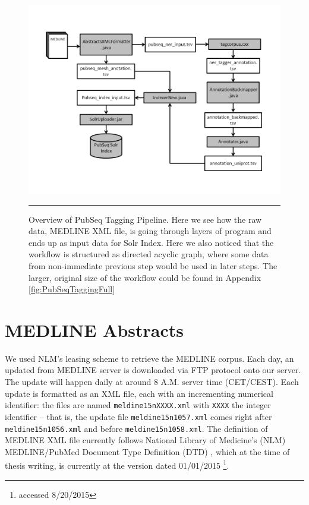 \begin{figure}[htbp]
    \includegraphics[width=6in]{Figures/tagging_pipeline_complete.png}
    \rule{35em}{0.5pt}
  \caption[(Resized) Overview of PubSeq Tagging Pipeline with all essential programs showed as nodes and important input/output files shown]{Overview of PubSeq Tagging Pipeline. Here we see how the raw data, MEDLINE XML file, is going through layers of program and ends up as input data for Solr Index. Here we also noticed that the workflow is structured as directed acyclic graph, where some data from non-immediate previous step would be used in later steps. The larger, original size of the workflow could be found in Appendix \ref{fig:PubSeqTaggingFull}}
  \label{fig:PubSeqTaggingComplete}
\end{figure}


\section{MEDLINE Abstracts}

\label{sec:MEDLINEAbstracts}

We used NLM's leasing scheme \citep{MEDLINE} to retrieve the MEDLINE corpus. Each day, an updated from MEDLINE server is downloaded via FTP protocol onto our server. The update will happen daily at around 8 A.M. server time (CET/CEST). Each update is formatted as an XML file, each with an incrementing numerical identifier: the files are named \texttt{meldine15nXXXX.xml} with \texttt{XXXX} the integer identifier -- that is, the update file \texttt{meldine15n1057.xml} comes right after \texttt{meldine15n1056.xml} and before \texttt{meldine15n1058.xml}. The definition of MEDLINE XML file currently follows National Library of Medicine's (NLM) MEDLINE/PubMed Document Type Definition (DTD) \citep{MEDLINEDTD}, which at the time of thesis writing, is currently at the version dated 01/01/2015 \footnote{accessed 8/20/2015}.


